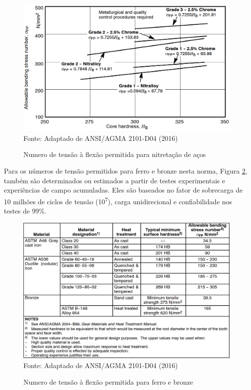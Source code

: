 \documentclass[12pt,a4paper]{article}
\begin{document}
\begin{figure}[!htb]
    \centering
    \caption{Numero de tensão à flexão permitida para nitretação de aços}
    \includegraphics[scale=0.46]{Imagens/Img30.png}\\
    {\footnotesize Fonte: Adaptado de ANSI/AGMA 2101-D04 (2016)}
    \label{fig:30}
\end{figure}

Para os números de tensão permitidos para ferro e bronze nesta norma,
Figura {\ref{fig:31}}, também são determinados ou
estimados a partir de testes experimentais e experiências de campo
acumuladas. Eles são baseados no fator de sobrecarga de 10 milhões de
ciclos de tensão (10\textsuperscript{7}), carga unidirecional e
confiabilidade nos testes de 99\%.

\begin{figure}[!htb]
    \centering
    \caption{Numero de tensão à flexão permitida para ferro e bronze}
    \includegraphics[scale=0.46]{Imagens/Img31.png}\\
    {\footnotesize Fonte: Adaptado de ANSI/AGMA 2101-D04 (2016)}
    \label{fig:31}
\end{figure}
\end{document}
